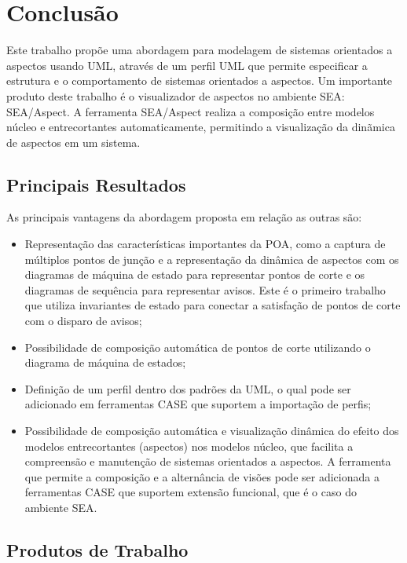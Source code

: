 \chapter{Conclusão}

Este trabalho propõe uma abordagem para modelagem de sistemas orientados a aspectos usando UML, através de um perfil UML que permite especificar a
estrutura e o comportamento de sistemas orientados a aspectos. Um importante produto deste trabalho é o visualizador de aspectos no
ambiente SEA: SEA/Aspect. A ferramenta SEA/Aspect realiza a composição entre modelos núcleo e entrecortantes automaticamente, permitindo a
visualização da dinãmica de aspectos em um sistema.

\section{Principais Resultados}

As principais vantagens da abordagem proposta em relação as outras são: 

\begin{itemize}
\item Representação das características importantes da POA, como a captura de múltiplos pontos de junção e a representação da dinâmica de aspectos
com os diagramas de máquina de estado para representar pontos de corte e os diagramas de sequência para representar avisos. Este é o primeiro
trabalho que utiliza invariantes de estado para conectar a satisfação de pontos de corte com o disparo de avisos;
\item Possibilidade de composição automática de pontos de corte utilizando o diagrama de máquina de estados;
\item Definição de um perfil dentro dos padrões da UML, o qual pode ser adicionado em ferramentas CASE que suportem a importação
de perfis; 
\item Possibilidade de composição automática e visualização dinâmica do efeito dos modelos entrecortantes (aspectos) nos modelos núcleo, que facilita
a compreensão e manutenção de sistemas orientados a aspectos. A ferramenta que permite a composição e a alternância de visões pode ser adicionada a ferramentas CASE 
que suportem extensão funcional, que é o caso do ambiente SEA.
\end{itemize}

\section{Produtos de Trabalho}

